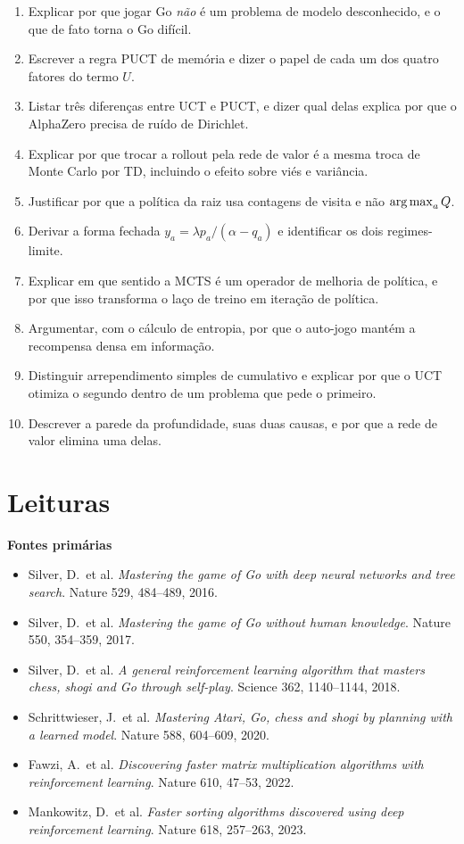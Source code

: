 \documentclass[11pt]{article}
\begin{document}
\begin{enumerate}
  \item Explicar por que jogar Go \emph{não} é um problema de modelo desconhecido,
        e o que de fato torna o Go difícil.
  \item Escrever a regra PUCT de memória e dizer o papel de cada um dos quatro
        fatores do termo $U$.
  \item Listar três diferenças entre UCT e PUCT, e dizer qual delas explica por
        que o AlphaZero precisa de ruído de Dirichlet.
  \item Explicar por que trocar a rollout pela rede de valor é a mesma troca de
        Monte Carlo por TD, incluindo o efeito sobre viés e variância.
  \item Justificar por que a política da raiz usa contagens de visita e não
        $\operatorname*{arg\,max}_a Q$.
  \item Derivar a forma fechada $y_a = \lambda p_a/(\alpha - q_a)$ e identificar os
        dois regimes-limite.
  \item Explicar em que sentido a MCTS é um operador de melhoria de política, e
        por que isso transforma o laço de treino em iteração de política.
  \item Argumentar, com o cálculo de entropia, por que o auto-jogo mantém a
        recompensa densa em informação.
  \item Distinguir arrependimento simples de cumulativo e explicar por que o UCT
        otimiza o segundo dentro de um problema que pede o primeiro.
  \item Descrever a parede da profundidade, suas duas causas, e por que a rede de
        valor elimina uma delas.
\end{enumerate}

\section{Leituras}

\textbf{Fontes primárias}
\begin{itemize}
  \item Silver, D.\ et al. \emph{Mastering the game of Go with deep neural networks
        and tree search}. Nature 529, 484--489, 2016.
  \item Silver, D.\ et al. \emph{Mastering the game of Go without human knowledge}.
        Nature 550, 354--359, 2017.
  \item Silver, D.\ et al. \emph{A general reinforcement learning algorithm that
        masters chess, shogi and Go through self-play}. Science 362, 1140--1144, 2018.
  \item Schrittwieser, J.\ et al. \emph{Mastering Atari, Go, chess and shogi by
        planning with a learned model}. Nature 588, 604--609, 2020.
  \item Fawzi, A.\ et al. \emph{Discovering faster matrix multiplication algorithms
        with reinforcement learning}. Nature 610, 47--53, 2022.
  \item Mankowitz, D.\ et al. \emph{Faster sorting algorithms discovered using deep
        reinforcement learning}. Nature 618, 257--263, 2023.
\end{itemize}
\end{document}
